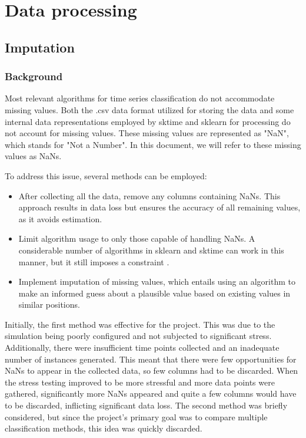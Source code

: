 \chapter{Data processing}

\section{Imputation}

\subsection{Background}
Most relevant algorithms for time series classification do not accommodate missing values. Both the .csv data format utilized for storing the data and some internal data representations employed by sktime and sklearn for processing do not account for missing values. These missing values are represented as "NaN", which stands for "Not a Number". In this document, we will refer to these missing values as NaNs.

To address this issue, several methods can be employed:
\begin{itemize}
\item After collecting all the data, remove any columns containing NaNs. This approach results in data loss but ensures the accuracy of all remaining values, as it avoids estimation.
\item Limit algorithm usage to only those capable of handling NaNs. A considerable number of algorithms in sklearn and sktime can work in this manner, but it still imposes a constraint \cite*{Scikit-learn-imputation}.
\item Implement imputation of missing values, which entails using an algorithm to make an informed guess about a plausible value based on existing values in similar positions.
\end{itemize}

Initially, the first method was effective for the project. This was due to the simulation being poorly configured and not subjected to significant stress. Additionally, there were insufficient time points collected and an inadequate number of instances generated. This meant that there were few opportunities for NaNs to appear in the collected data, so few columns had to be discarded. When the stress testing improved to be more stressful and more data points were gathered, significantly more NaNs appeared and quite a few columns would have to be discarded, inflicting significant data loss.
The second method was briefly considered, but since the project's primary goal was to compare multiple classification methods, this idea was quickly discarded.

